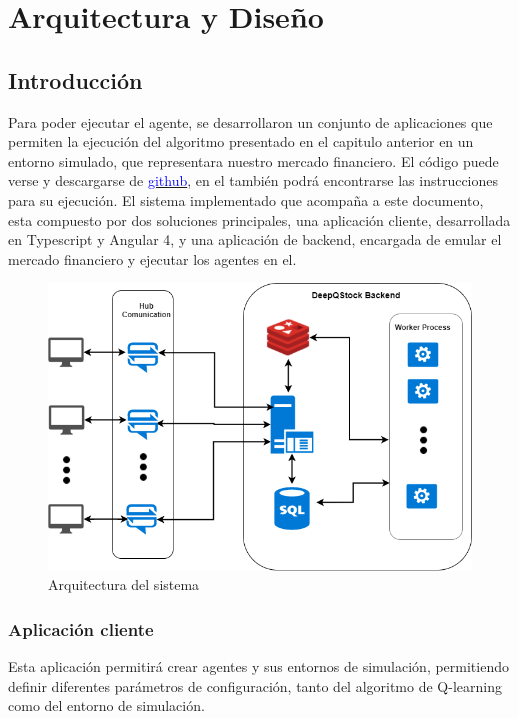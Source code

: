 \chapter{Arquitectura y Diseño}


\section{Introducción}

Para poder ejecutar el agente, se desarrollaron un conjunto de aplicaciones que permiten la ejecución del algoritmo presentado en el capitulo anterior en un entorno simulado, que representara nuestro mercado financiero.
El código puede verse y descargarse de \href{https://github.com/jcaramello/deepQ-stock}{\textcolor{blue}{github}}, en el también podrá encontrarse las instrucciones para su ejecución. El sistema implementado que acompaña a este documento, esta compuesto por dos soluciones principales, una aplicación cliente, desarrollada en Typescript y Angular 4, y una aplicación de backend, 
encargada de emular el mercado financiero y ejecutar los agentes en el.

\begin{figure}[h!]
	\includegraphics[scale=0.5]{imagenes/deepQStockArchitectureOverview.png}
	\caption{Arquitectura del sistema}
\end{figure}

\subsection{Aplicación cliente}
Esta aplicación permitirá crear agentes y sus entornos de simulación, permitiendo definir diferentes parámetros de configuración, tanto del algoritmo de Q-learning como del entorno de simulación.\\

